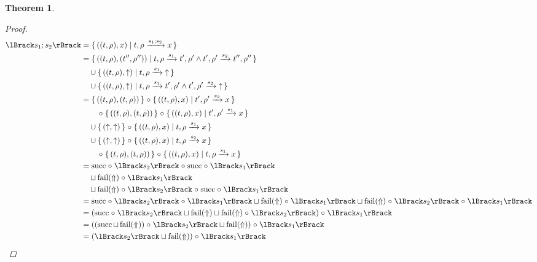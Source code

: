 \documentclass{article}
\newtheorem{theorem}{Theorem}
\newcommand{\fail}{\ensuremath \text{$\uparrow$}}
\newcommand{\seq}[2]{\ensuremath #1 ; #2}
\newcommand{\transform}[5]{#1, #2 \xrightarrow{#3} #4, #5}
\newcommand{\transformx}[4]{#1, #2 \xrightarrow{#3} #4}
\newcommand{\transformfail}[3]{#1, #2 \xrightarrow{#3} \fail}
\newcommand{\Fail}{\ensuremath \text{$\Uparrow$}}
\newcommand{\sem}[1]{\ensuremath \lBrack #1 \rBrack}
\newcommand{\setbuild}[2]{\ensuremath \{\, #1 \mid #2 \,\}}
\newcommand{\setbuildc}[1]{\ensuremath \{\, #1 \,\}}
\newcommand{\lfail}{\ensuremath \operatorname{fail}}
\newcommand{\lsucc}{\ensuremath \operatorname{succ}}
\newcommand{\comp}{\ensuremath \mathrel{\circ}}
\begin{document}
\begin{theorem}
\begin{proof}
\begin{align*}
  \sem{\seq{s_1}{s_2}}
    &= \setbuild{((t,\rho),x)}{\transformx{t}{\rho}{\seq{s_1}{s_2}}{x}} \\
    &= \setbuild{((t,\rho),(t'',\rho''))}{\transform{t}{\rho}{s_1}{t'}{\rho'} \land \transform{t'}{\rho'}{s_2}{t''}{\rho''}}\\
    &\quad \cup \setbuild{((t,\rho),\fail)}{\transformfail{t}{\rho}{s_1}} \\
    &\quad \cup \setbuild{((t,\rho),\fail)}{\transform{t}{\rho}{s_1}{t'}{\rho'} \land \transformfail{t'}{\rho'}{s_2}} \\
    &= \setbuildc{ ((t,\rho),(t,\rho)) } \comp \setbuild{((t,\rho),x)}{\transformx{t'}{\rho'}{s_2}{x}} \\
    &\qquad \comp \setbuildc{ ((t,\rho),(t,\rho)) } \comp \setbuild{((t,\rho),x)}{\transformx{t'}{\rho'}{s_1}{x}} \\
    &\quad \cup \setbuildc{(\fail,\fail)} \comp \setbuild{((t,\rho),x)}{\transformx{t}{\rho}{s_1}{x}} \\
    &\quad \cup \setbuildc{(\fail,\fail)} \comp \setbuild{((t,\rho),x)}{\transformx{t}{\rho}{s_2}{x}} \\
    &\qquad \comp \setbuildc{(t,\rho),(t,\rho))} \comp \setbuild{((t,\rho),x)}{\transformx{t}{\rho}{s_1}{x}} \\
    &= \lsucc \comp \sem{s_2} \comp \lsucc \comp \sem{s_1} \\
    &\quad \sqcup \lfail(\Fail) \comp \sem{s_1} \\
    &\quad \sqcup \lfail(\Fail) \comp \sem{s_2} \comp \lsucc \comp \sem{s_1} \\
    &= \lsucc \comp \sem{s_2} \comp \sem{s_1} \sqcup \lfail(\Fail) \comp \sem{s_1} \sqcup \lfail(\Fail) \comp \sem{s_2} \comp \sem{s_1} \\
    &= \left(\lsucc \comp \sem{s_2} \sqcup \lfail(\Fail) \sqcup \lfail(\Fail) \comp \sem{s_2}\right) \comp \sem{s_1} \\
    &= \left(\left(\lsucc \sqcup \lfail(\Fail)\right) \comp \sem{s_2} \sqcup \lfail(\Fail) \right) \comp \sem{s_1} \\
    &= \left(\sem{s_2} \sqcup \lfail(\Fail) \right) \comp \sem{s_1} \\
\end{align*}


\end{proof}
\end{theorem}
\end{document}
